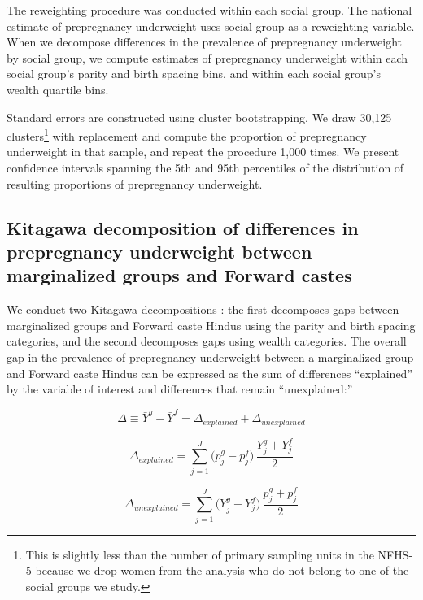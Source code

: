 \documentclass[12pt]{article}
\begin{document}
The reweighting procedure was conducted within each social group.  The national estimate of prepregnancy underweight uses social group as a reweighting variable.  When we decompose differences in the prevalence of prepregnancy underweight by social group, we compute estimates of prepregnancy underweight within each social group's parity and birth spacing bins, and within each social group's wealth quartile bins.  

Standard errors are constructed using cluster bootstrapping.  We draw 30,125 clusters\footnote{This is slightly less than the number of primary sampling units in the NFHS-5 because we drop women from the analysis who do not belong to one of the social groups we study.} with replacement and compute the proportion of prepregnancy underweight in that sample, and repeat the procedure 1,000 times.  We present confidence intervals spanning the 5th and 95th percentiles of the distribution of resulting proportions of prepregnancy underweight.

\subsection{Kitagawa decomposition of differences in prepregnancy underweight between marginalized groups and Forward castes}

We conduct two Kitagawa decompositions \citep{kitagawa1955components}: the first decomposes gaps between marginalized groups and Forward caste Hindus using the parity and birth spacing categories, and the second decomposes gaps using wealth categories.  The overall gap in the prevalence of prepregnancy underweight between a marginalized group and Forward caste Hindus can be expressed as the sum of differences ``explained'' by the variable of interest and differences that remain ``unexplained:''

\begin{equation}
\label{eq:kitagawa}
\Delta \equiv \bar Y^{g} - \bar Y^{f}
= \Delta_{explained} + \Delta_{unexplained}
\end{equation}

\begin{equation} \label{eq_explained}
    \Delta_{explained} = \sum_{j=1}^{J} \big(p_j^{g} - p_j^{f}\big)\,\frac{Y_j^{g} + Y_j^{f}}{2}
\end{equation}

\begin{equation} \label{eq_unexplained}
    \Delta_{unexplained} = \sum_{j=1}^{J} \big(Y_j^{g} - Y_j^{f}\big)\,\frac{p_j^{g} + p_j^{f}}{2}
\end{equation}
\end{document}
